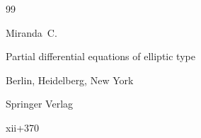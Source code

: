 \begin{thebibliography}{99}












\by Miranda~C.

\book Partial differential equations of elliptic type

\publaddr Berlin, Heidelberg, New York

\publ Springer Verlag 

\totalpages xii+370 




\end{thebibliography}



\RuDate



\makeentitle




%









\EngRef



